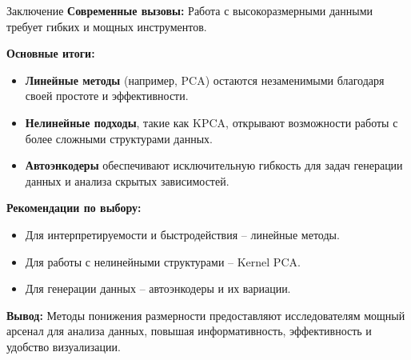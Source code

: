 \begin{frame}[allowframebreaks]{Заключение}
    \textbf{Современные вызовы:} Работа с высокоразмерными данными требует гибких и мощных инструментов.

    \textbf{Основные итоги:}
    \begin{itemize}
        \item \textbf{Линейные методы} (например, PCA) остаются незаменимыми благодаря своей простоте и эффективности.
        \item \textbf{Нелинейные подходы}, такие как KPCA, открывают возможности работы с более сложными структурами данных.
        \item \textbf{Автоэнкодеры} обеспечивают исключительную гибкость для задач генерации данных и анализа скрытых зависимостей.
    \end{itemize}

    \framebreak

    \textbf{Рекомендации по выбору:}
    \begin{itemize}
        \item Для интерпретируемости и быстродействия – линейные методы.
        \item Для работы с нелинейными структурами – Kernel PCA.
        \item Для генерации данных – автоэнкодеры и их вариации.
    \end{itemize}

    \textbf{Вывод:} Методы понижения размерности предоставляют исследователям мощный арсенал для анализа данных, повышая информативность, эффективность и удобство визуализации.
\end{frame}
